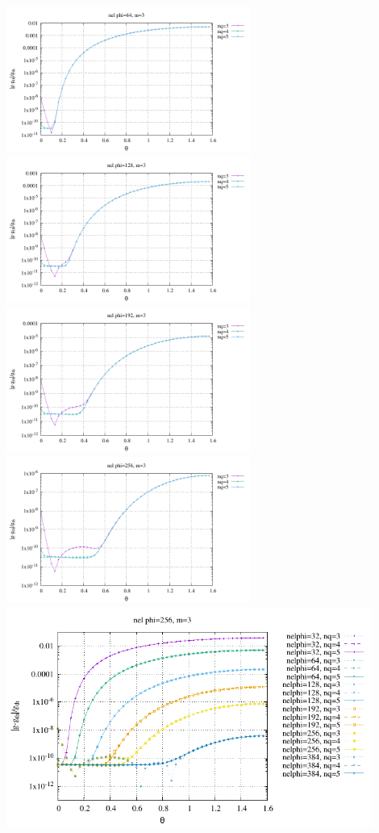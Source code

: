 \begin{center}
\includegraphics[width=8cm]{python_codes/fieldstone_152/RESULTS/exp1/gravity/nelr64/gravity_64nq.pdf}
\includegraphics[width=8cm]{python_codes/fieldstone_152/RESULTS/exp1/gravity/nelr64/gravity_128nq.pdf}
\includegraphics[width=8cm]{python_codes/fieldstone_152/RESULTS/exp1/gravity/nelr64/gravity_192nq.pdf}
\includegraphics[width=8cm]{python_codes/fieldstone_152/RESULTS/exp1/gravity/nelr64/gravity_256nq.pdf}\\
\includegraphics[width=12cm]{python_codes/fieldstone_152/RESULTS/exp1/gravity/nelr64/gravity_error.pdf}
\end{center}


